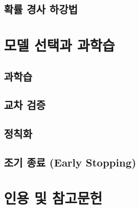 \documentclass[../main.tex]{subfiles}
\begin{document}
\subsection{확률 경사 하강법}

\section{모델 선택과 과학습}
\subsection{과학습}
\subsection{교차 검증}
\subsection{정칙화}
\subsection{조기 종료 (Early Stopping)}
\section*{인용 및 참고문헌}
\end{document}
